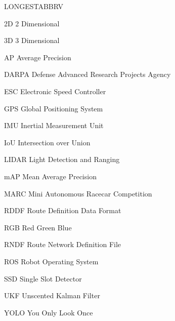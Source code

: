 \begin{theglossary}{LONGESTABBRV}
\item[2D] 2 Dimensional
\item[3D] 3 Dimensional
\item[AP] Average Precision
\item[DARPA] Defense Advanced Research Projects Agency
\item[ESC] Electronic Speed Controller
\item[GPS] Global Positioning System
\item[IMU] Inertial Measurement Unit
\item[IoU] Intersection over Union
\item[LIDAR] Light Detection and Ranging
\item[mAP] Mean Average Precision
\item[MARC] Mini Autonomous Racecar Competition
\item[RDDF] Route Definition Data Format
\item[RGB] Red Green Blue
\item[RNDF] Route Network Definition File
\item[ROS] Robot Operating System
\item[SSD] Single Slot Detector
\item[UKF] Unscented Kalman Filter
\item[YOLO] You Only Look Once
\end{theglossary}
